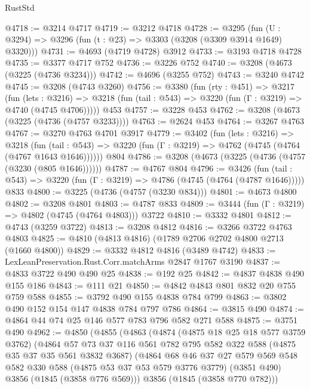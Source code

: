 \begin{lexlean}{RustStd}
\begin{coremodule}
@4718 := @3214 @4717
@4719 := @3212 @4718
@4728 := @3295 (fun (U : @3294) => @3296 (fun (t : @23) => @3303 (@3208 (@3309 @3914 @1649) @3320)))
@4731 := @4693 (@4719 @4728) @3912
@4733 := @3193 @4718 @4728
@4735 := @3377 @4717 @752
@4736 := @3226 @752
@4740 := @3208 (@4673 (@3225 (@4736 @3234)))
@4742 := @4696 (@3255 @752)
@4743 := @3240 @4742
@4745 := @3208 (@4743 @3260)
@4756 := @3380
    (fun (rty : @451) =>
    @3217
      (fun (lets : @3216) =>
      @3218 (fun (tail : @543) => @3220 (fun (Γ : @3219) => @4740 (@4745 @4706)))))
    @453
@4757 := @3228 @453
@4762 := @3208 (@4673 (@3225 (@4736 (@4757 @3233))))
@4763 := @2624 @453
@4764 := @3267 @4763
@4767 := @3270 @4763 @4701 @3917
@4779 := @3402
    (fun (lets : @3216) =>
    @3218
      (fun (tail : @543) => @3220 (fun (Γ : @3219) => @4762 (@4745 (@4764 (@4767 @1643 @1646))))))
    @804
@4786 := @3208 (@4673 (@3225 (@4736 (@4757 (@3230 (@805 @1646))))))
@4787 := @4767 @804
@4796 := @3426
    (fun (tail : @543) => @3220 (fun (Γ : @3219) => @4786 (@4745 (@4764 (@4787 @1646)))))
    @833
@4800 := @3225 (@4736 (@4757 (@3230 @834)))
@4801 := @4673 @4800
@4802 := @3208 @4801
@4803 := @4787 @833
@4809 := @3444 (fun (Γ : @3219) => @4802 (@4745 (@4764 @4803))) @3722
@4810 := @3332 @4801
@4812 := @4743 (@3259 @3722)
@4813 := @3208 @4812
@4816 := @3266 @3722 @4763 @4803
@4825 := @4810 (@4813 @4816) (@1789 @2706 @2702 @4800 @2713 (@1660 @4800))
@4829 := @3332 @4812 @4816 (@3489 @4742)
@4833 := LexLeanPreservation.Rust.Corr.matchArms @2847 @1767 @3190
@4837 := @4833 @3722 @490 @490 @25
@4838 := @192 @25
@4842 := @4837 @4838 @490 @155 @186
@4843 := @111 @21
@4850 := @4842 @4843 @801 @832 @20 @755 @759 @588
@4855 := @3792 @490 @155 @4838 @784 @799
@4863 := @3802 @490 @152 @154 @147 @4838 @784 @797 @786
@4864 := @3815 @490
@4874 := @4864 @44 @74 @25 @146 @577 @783 @796 @582 @271 @588
@4875 := @3751 @490
@4962 := @4850
    (@4855
      (@4863
        (@4874
          (@4875 @18 @25 @18 @577 @3759 @3762)
          (@4864
            @57
            @73
            @37
            @116
            @561
            @782
            @795
            @582
            @322
            @588
            (@4875 @35 @37 @35 @561 @3832 @3687)
            (@4864
              @68
              @46
              @37
              @27
              @579
              @569
              @548
              @582
              @330
              @588
              (@4875 @53 @37 @53 @579 @3776 @3779)
              (@3851 @490)
              @3856
              (@1845 (@3858 @776 @569)))
            @3856
            (@1845 (@3858 @770 @782)))

\end{coremodule}
\end{lexlean}
